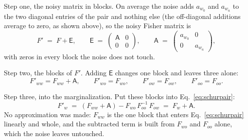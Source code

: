 \documentclass[11pt]{article}
\begin{document}
Step one, the noisy matrix in blocks.  On average the noise adds
$a_{w_0}$ and $a_{w_a}$ to the two diagonal entries of the pair and
nothing else (the off-diagonal additions average to zero, as shown
above), so the noisy Fisher matrix is
\begin{equation*}
  F' \;=\; F + \mathsf{E} ,
  \qquad
  \mathsf{E} \;=\;
  \begin{pmatrix} \mathsf{A} & 0 \\ 0 & 0 \end{pmatrix} ,
  \qquad
  \mathsf{A} \;=\;
  \begin{pmatrix} a_{w_0} & 0 \\ 0 & a_{w_a} \end{pmatrix} ,
\end{equation*}
with zeros in every block the noise does not touch.

Step two, the blocks of $F'$.  Adding $\mathsf{E}$ changes one block
and leaves three alone:
\begin{equation*}
  F'_{ww} = F_{ww} + \mathsf{A} ,
  \qquad
  F'_{wo} = F_{wo} ,
  \qquad
  F'_{ow} = F_{ow} ,
  \qquad
  F'_{oo} = F_{oo} .
\end{equation*}

Step three, into the marginalization.  Put these blocks into
Eq.~\eqref{eq:schurpair}:
\begin{equation*}
  F'_w \;=\; (F_{ww} + \mathsf{A}) - F_{wo}\,F_{oo}^{-1}\,F_{ow}
  \;=\; F_w + \mathsf{A} .
\end{equation*}
No approximation was made: $F_{ww}$ is the one block that enters
Eq.~\eqref{eq:schurpair} linearly and whole, and the subtracted term
is built from $F_{wo}$ and $F_{oo}$ alone, which the noise leaves
untouched.
\end{document}
